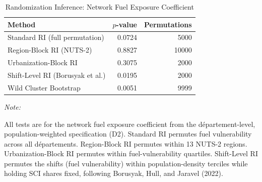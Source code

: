 \begin{table}[!h]
\centering
\caption{\label{tab:ri_comparison}Randomization Inference: Network Fuel Exposure Coefficient}
\centering
\begin{threeparttable}
\begin{tabular}[t]{lrr}
\toprule
Method & $p$-value & Permutations\\
\midrule
Standard RI (full permutation) & 0.0724 & 5000\\
Region-Block RI (NUTS-2) & 0.8827 & 10000\\
Urbanization-Block RI & 0.3075 & 2000\\
Shift-Level RI (Borusyak et al.) & 0.0195 & 2000\\
Wild Cluster Bootstrap & 0.0051 & 9999\\
\bottomrule
\end{tabular}
\begin{tablenotes}
\item \textit{Note: } 
\item All tests are for the network fuel exposure coefficient from the département-level, population-weighted specification (D2). Standard RI permutes fuel vulnerability across all départements. Region-Block RI permutes within 13 NUTS-2 regions. Urbanization-Block RI permutes within fuel-vulnerability quartiles. Shift-Level RI permutes the shifts (fuel vulnerability) within population-density terciles while holding SCI shares fixed, following Borusyak, Hull, and Jaravel (2022).
\end{tablenotes}
\end{threeparttable}
\end{table}

